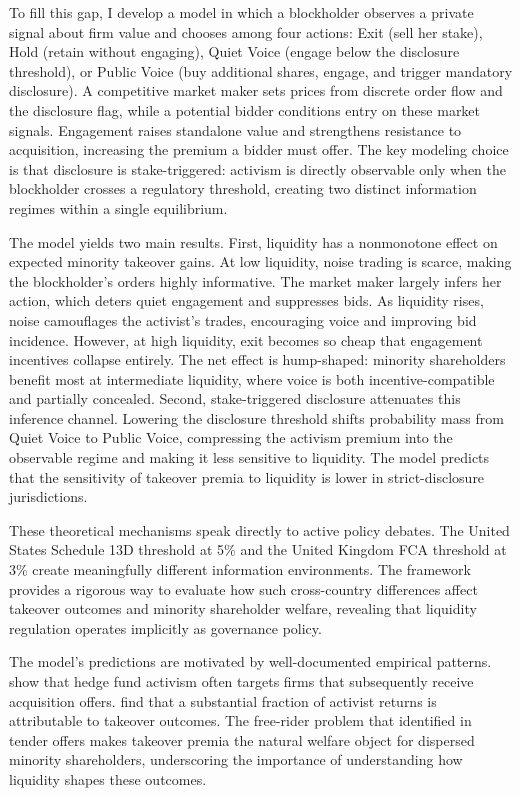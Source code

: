 \documentclass[11pt]{article}
\newcommand{\1}{\mathbf{1}}
\begin{document}
To fill this gap, I develop a model in which a blockholder observes a private signal about firm value and chooses among four actions: Exit (sell her stake), Hold (retain without engaging), Quiet Voice (engage below the disclosure threshold), or Public Voice (buy additional shares, engage, and trigger mandatory disclosure). A competitive market maker sets prices from discrete order flow and the disclosure flag, while a potential bidder conditions entry on these market signals. Engagement raises standalone value and strengthens resistance to acquisition, increasing the premium a bidder must offer. The key modeling choice is that disclosure is stake-triggered: activism is directly observable only when the blockholder crosses a regulatory threshold, creating two distinct information regimes within a single equilibrium.

The model yields two main results. First, liquidity has a nonmonotone effect on expected minority takeover gains. At low liquidity, noise trading is scarce, making the blockholder's orders highly informative. The market maker largely infers her action, which deters quiet engagement and suppresses bids. As liquidity rises, noise camouflages the activist's trades, encouraging voice and improving bid incidence. However, at high liquidity, exit becomes so cheap that engagement incentives collapse entirely. The net effect is hump-shaped: minority shareholders benefit most at intermediate liquidity, where voice is both incentive-compatible and partially concealed. Second, stake-triggered disclosure attenuates this inference channel. Lowering the disclosure threshold shifts probability mass from Quiet Voice to Public Voice, compressing the activism premium into the observable regime and making it less sensitive to liquidity. The model predicts that the sensitivity of takeover premia to liquidity is lower in strict-disclosure jurisdictions.

These theoretical mechanisms speak directly to active policy debates. The United States Schedule 13D threshold at 5\% and the United Kingdom FCA threshold at 3\% create meaningfully different information environments. The framework provides a rigorous way to evaluate how such cross-country differences affect takeover outcomes and minority shareholder welfare, revealing that liquidity regulation operates implicitly as governance policy.

The model's predictions are motivated by well-documented empirical patterns. \citet{BravJiangPartnoyThomas2008} show that hedge fund activism often targets firms that subsequently receive acquisition offers. \citet{GreenwoodSchor2009} find that a substantial fraction of activist returns is attributable to takeover outcomes. The free-rider problem that \citet{GrossmanHart1980} identified in tender offers makes takeover premia the natural welfare object for dispersed minority shareholders, underscoring the importance of understanding how liquidity shapes these outcomes.
\end{document}
